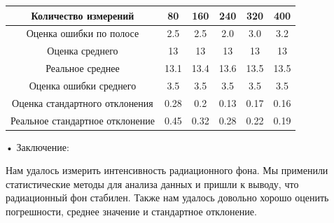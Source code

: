 \documentclass[a4paper,14pt]{extarticle}
\begin{document}
	
	\begin{center}
		
		\begin{tabular}{|c|c|c|c|c|c|}
			\hline
			Количество измерений & 80 & 160 & 240 & 320 & 400  \\ \hline
			Оценка ошибки по полосе & 2.5 & 2.5 & 2.0 & 3.0 & 3.2   \\ \hline
			Оценка среднего & 13 & 13 & 13 & 13 & 13   \\ \hline
			Реальное среднее & 13.1 & 13.4 & 13.6 & 13.5 & 13.5   \\  \hline
			Оценка ошибки среднего & 3.5 & 3.5 & 3.5 & 3.5 & 3.5  \\ \hline
			Оценка стандартного отклонения & 0.28 & 0.2 & 0.13 & 0.17 & 0.16  \\  \hline
			Реальное стандартное отклонение & 0.45 & 0.32 & 0.28 & 0.22 & 0.19   \\ \hline
			
		\end{tabular}
	\end{center}
	
	
	
	
	• Заключение:
	\newline
	
	Нам удалось измерить интенсивность радиационного фона. Мы применили статистические методы для анализа данных и пришли к выводу, что радиационный фон стабилен. Также нам удалось довольно хорошо оценить погрешности, среднее значение и стандартное отклонение.
\end{document}

